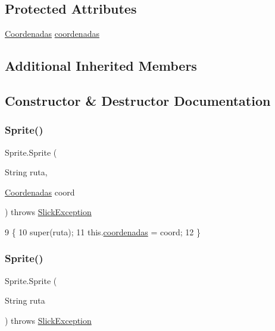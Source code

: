 \subsection*{Protected Attributes}
\begin{DoxyCompactItemize}
\item 
\mbox{\hyperlink{class_coordenadas}{Coordenadas}} \mbox{\hyperlink{class_sprite_ada651b6921cee54a619e11c4eb01526d}{coordenadas}}
\end{DoxyCompactItemize}
\subsection*{Additional Inherited Members}


\subsection{Constructor \& Destructor Documentation}
\mbox{\label{class_sprite_ad2d0e8ee8d56c6939aeb7c85e8f95ad1}} 
\subsubsection{\texorpdfstring{Sprite()}{Sprite()}\hspace{0.1cm}{\footnotesize\ttfamily [1/3]}}
{\footnotesize\ttfamily Sprite.\+Sprite (\begin{DoxyParamCaption}\item[{String}]{ruta,  }\item[{\mbox{\hyperlink{class_coordenadas}{Coordenadas}}}]{coord }\end{DoxyParamCaption}) throws \mbox{\hyperlink{classorg_1_1newdawn_1_1slick_1_1_slick_exception}{Slick\+Exception}}\hspace{0.3cm}{\ttfamily [inline]}}


\begin{DoxyCode}
9                                                                        \{
10         super(ruta);
11         this.\mbox{\hyperlink{class_sprite_ada651b6921cee54a619e11c4eb01526d}{coordenadas}} = coord;
12     \}
\end{DoxyCode}
\mbox{\label{class_sprite_abcc912a68992f5d1f3566386f885f9bb}} 
\subsubsection{\texorpdfstring{Sprite()}{Sprite()}\hspace{0.1cm}{\footnotesize\ttfamily [2/3]}}
{\footnotesize\ttfamily Sprite.\+Sprite (\begin{DoxyParamCaption}\item[{String}]{ruta }\end{DoxyParamCaption}) throws \mbox{\hyperlink{classorg_1_1newdawn_1_1slick_1_1_slick_exception}{Slick\+Exception}}\hspace{0.3cm}{\ttfamily [inline]}}


